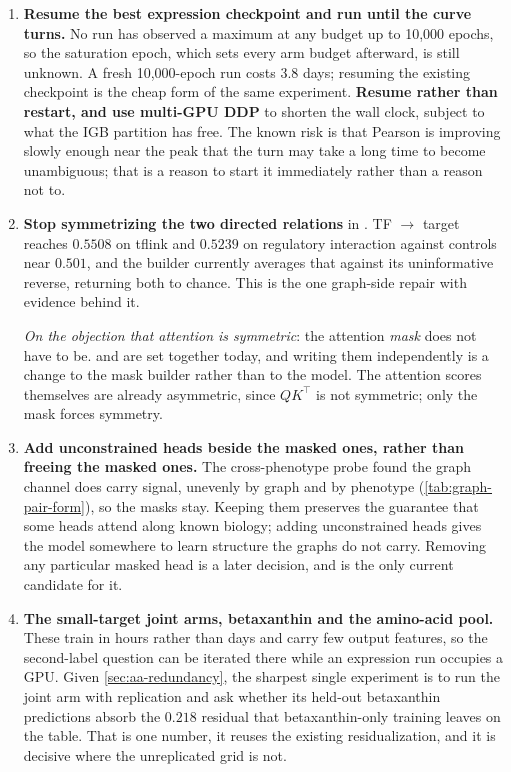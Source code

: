 \begin{enumerate}
\item \textbf{Resume the best expression checkpoint and run until the curve turns.} No run
  has observed a maximum at any budget up to 10,000 epochs, so the saturation epoch, which
  sets every arm budget afterward, is still unknown. A fresh 10,000-epoch run costs 3.8
  days; resuming the existing checkpoint is the cheap form of the same experiment.
  \textbf{Resume rather than restart, and use multi-GPU DDP} to shorten the wall clock,
  subject to what the IGB  partition has free. The known risk is that Pearson is
  improving slowly enough near the peak that the turn may take a long time to become
  unambiguous; that is a reason to start it immediately rather than a reason not to.

\item \textbf{Stop symmetrizing the two directed relations} in .
  TF $\to$ target reaches $0.5508$ on tflink and $0.5239$ on regulatory interaction against
  controls near $0.501$, and the builder currently averages that against its uninformative
  reverse, returning both to chance. This is the one graph-side repair with evidence behind
  it.

  \emph{On the objection that attention is symmetric}: the attention \emph{mask} does not
  have to be.  and  are set together today, and
  writing them independently is a change to the mask builder rather than to the model. The
  attention scores themselves are already asymmetric, since $QK^\top$ is not symmetric; only
  the mask forces symmetry.

\item \textbf{Add unconstrained heads beside the masked ones, rather than freeing the masked
  ones.} The cross-phenotype probe found the graph channel does carry signal, unevenly by
  graph and by phenotype (\cref{tab:graph-pair-form}), so the masks stay. Keeping them
  preserves the guarantee that some heads attend along known biology; adding unconstrained
  heads gives the model somewhere to learn structure the graphs do not carry. Removing any
  particular masked head is a later decision, and  is the only current candidate
  for it.

\item \textbf{The small-target joint arms, betaxanthin and the amino-acid pool.} These train
  in hours rather than days and carry few output features, so the second-label question can
  be iterated there while an expression run occupies a GPU. Given
  \cref{sec:aa-redundancy}, the sharpest single experiment is to run the joint arm with
  replication and ask whether its held-out betaxanthin predictions absorb the $0.218$
  residual that betaxanthin-only training leaves on the table. That is one number, it reuses
  the existing residualization, and it is decisive where the unreplicated grid is not.
\end{enumerate}


